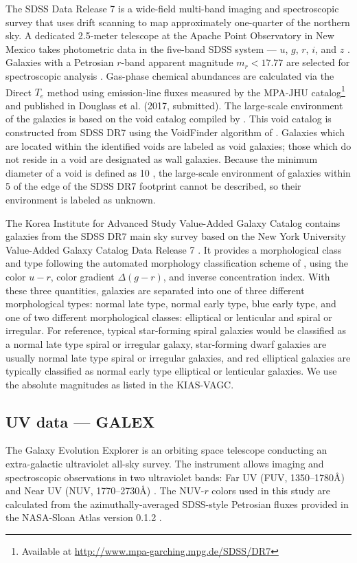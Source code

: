 The SDSS Data Release 7 \citep[DR7;][]{Abazajian09} is a wide-field multi-band 
imaging and spectroscopic survey that uses drift scanning to map approximately 
one-quarter of the northern sky.  A dedicated 2.5-meter telescope at the Apache 
Point Observatory in New Mexico takes photometric data in the five-band SDSS 
system --- $u$, $g$, $r$, $i$, and $z$ \citep{Fukugita96,Gunn98}.  Galaxies with 
a Petrosian $r$-band apparent magnitude $m_r < 17.77$ are selected for 
spectroscopic analysis \citep{Lupton01,Strauss02}.  Gas-phase chemical 
abundances are calculated via the Direct $T_e$ method using emission-line fluxes 
measured by the MPA-JHU catalog\footnote{Available at 
\url{http://www.mpa-garching.mpg.de/SDSS/DR7}} and published in Douglass et al. 
(2017, submitted).  The large-scale environment of the galaxies is based on the 
void catalog compiled by \cite{Pan12}.  This void catalog is constructed from 
SDSS DR7 using the VoidFinder algorithm of \cite{Hoyle02}.  Galaxies which are 
located within the identified voids are labeled as void galaxies; those which do 
not reside in a void are designated as wall galaxies.  Because the minimum 
diameter of a void is defined as 10 \hMpc , the large-scale environment of 
galaxies within 5 \hMpc of the edge of the SDSS DR7 footprint cannot be 
described, so their environment is labeled as unknown.

The Korea Institute for Advanced Study Value-Added Galaxy Catalog 
\citep[KIAS-VAGC;][]{Choi10} contains galaxies from the SDSS DR7 main sky survey 
based on the New York University Value-Added Galaxy Catalog Data Release 7 
\citep[NYU-VAGC;][]{Blanton05}.  It provides a morphological class and type 
following the automated morphology classification scheme of \cite{Park05}, using 
the color $u-r$, color gradient $\Delta (g-r)$, and inverse concentration index.  
With these three quantities, galaxies are separated into one of three different 
morphological types: normal late type, normal early type, blue early type, and 
one of two different morphological classes: elliptical or lenticular and spiral 
or irregular.  For reference, typical star-forming spiral galaxies would be 
classified as a normal late type spiral or irregular galaxy, star-forming dwarf 
galaxies are usually normal late type spiral or irregular galaxies, and red 
elliptical galaxies are typically classified as normal early type elliptical or 
lenticular galaxies.  We use the absolute magnitudes as listed in the KIAS-VAGC.

\subsection{UV data --- GALEX}\label{sec:GALEX}
The Galaxy Evolution Explorer \citep[GALEX]{Martin05} is an orbiting space 
telescope conducting an extra-galactic ultraviolet all-sky survey.  The 
instrument allows imaging and spectroscopic observations in two ultraviolet 
bands: Far UV (FUV, 1350--1780\AA) and Near UV (NUV, 1770--2730\AA) 
\citep{Morrissey07}.  The NUV-$r$ colors used in this study are calculated from 
the azimuthally-averaged SDSS-style Petrosian fluxes provided in the NASA-Sloan 
Atlas version 0.1.2 \citep[NSA]{Blanton11}.


